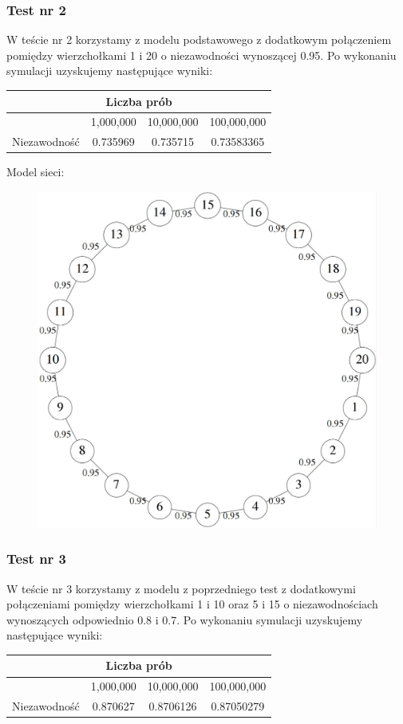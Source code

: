 \documentclass[titlepage]{article}
\begin{document}
\subsubsection{Test nr 2}
W teście nr 2 korzystamy z modelu podstawowego z dodatkowym połączeniem pomiędzy wierzchołkami 1 i 20 o niezawodności wynoszącej 0.95. Po wykonaniu symulacji uzyskujemy następujące wyniki:
\begin{table}[h!]
	\centering
    \label{tab:table2}
    \begin{tabular}{|c|c|c|c|}
    		\multicolumn{4}{c}{Liczba prób}\\
    		\hline
      	& 1,000,000 & 10,000,000 & 100,000,000\\
      	\hline
      	Niezawodność & 0.735969 & 0.735715 & 0.73583365\\
		\hline
    \end{tabular}
\end{table}

\noindent Model sieci:
\begin{figure}[h!]
	\centering
	\includegraphics[width=0.8\linewidth]{graph2.jpg}
\end{figure}

\newpage
\subsubsection{Test nr 3}
W teście nr 3 korzystamy z modelu z poprzedniego test z dodatkowymi połączeniami pomiędzy wierzchołkami 1 i 10 oraz 5 i 15 o niezawodnościach wynoszących odpowiednio 0.8 i 0.7. Po wykonaniu symulacji uzyskujemy następujące wyniki:
\begin{table}[h!]
	\centering
    \label{tab:table3}
    \begin{tabular}{|c|c|c|c|}
    		\multicolumn{4}{c}{Liczba prób}\\
    		\hline
      	& 1,000,000 & 10,000,000 & 100,000,000\\
      	\hline
      	Niezawodność & 0.870627 & 0.8706126 & 0.87050279\\
		\hline
    \end{tabular}
\end{table}
\end{document}
